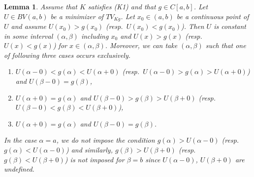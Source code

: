 \documentclass[10pt,a4paper]{amsart}
\newtheorem{lem}{Lemma}
\begin{document}
\begin{lem} \label{LPic}
Assume that $K$ satisfies (K1) and that $g\in C[a,b]$.
 Let $U\in BV(a,b)$ be a minimizer of $TV_{Kg}$.
 Let $x_0\in(a,b)$ be a continuous point of $U$ and assume $U(x_0)>g(x_0)$ (resp.\ $U(x_0)<g(x_0)$).
 Then $U$ is constant in some interval $(\alpha,\beta)$ including $x_0$ and $U(x)>g(x)$ (resp.\ $U(x)<g(x)$) for $x\in(\alpha,\beta)$.
 Moreover, we can take $(\alpha,\beta)$ such that 
one of following three cases occurs exclusively.
\begin{enumerate}
\item[(i)] $U(\alpha-0)<g(\alpha)<U(\alpha+0)$ (resp.\ $U(\alpha-0)>g(\alpha)>U(\alpha+0)$) and $U(\beta-0)=g(\beta)$,
\item[(i\hspace{-1pt}i)] $U(\alpha+0)=g(\alpha)$ and $U(\beta-0)>g(\beta)>U(\beta+0)$ (resp.\ $U(\beta-0)<g(\beta)<U(\beta+0)$),
\item[(i\hspace{-1pt}i\hspace{-1pt}i)] $U(\alpha+0)=g(\alpha)$ and $U(\beta-0)=g(\beta)$.
\end{enumerate}
In the case $\alpha=a$, we do not impose the condition $g(\alpha)>U(\alpha-0)$ (resp.\ $g(\alpha)<U(\alpha-0)$) and similarly, $g(\beta)>U(\beta+0)$ (resp.\ $g(\beta)<U(\beta+0)$) is not imposed for $\beta=b$ since $U(\alpha-0)$, $U(\beta+0)$ are undefined.
\end{lem}
\end{document}

